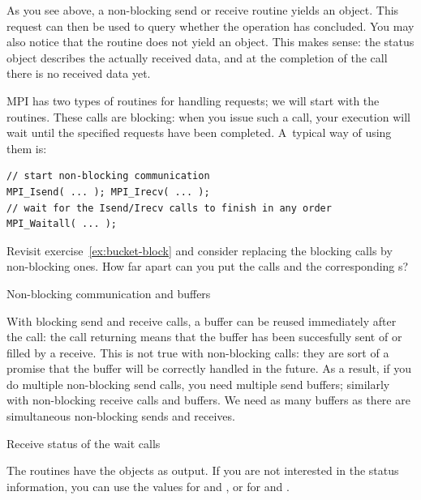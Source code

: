 As you see above, a non-blocking send or receive routine yields
an  object. This request can then be used to
query whether the operation has concluded. You may also notice that
the  routine does not 
yield an  object.
This makes sense: the status object
describes the actually received data, and at the completion of the
 call there is no received data yet.

MPI has two types of routines for handling requests; we will start
with the  routines. These
calls are blocking: when you issue
such a call, your execution will wait until the specified requests
have been completed. A~typical way of using them is:
\begin{lstlisting}
// start non-blocking communication
MPI_Isend( ... ); MPI_Irecv( ... );
// wait for the Isend/Irecv calls to finish in any order
MPI_Waitall( ... );
\end{lstlisting}


\begin{exercise}
  \label{ex:bucket-nonblock}
  Revisit exercise~\ref{ex:bucket-block} and consider replacing the blocking
  calls by non-blocking ones. How far apart can you put the
   calls and the corresponding s?
\end{exercise}

 {Non-blocking communication and buffers}

With blocking send and receive calls, a buffer can be reused
immediately after the call: the call returning means that the buffer
has been succesfully sent of or filled by a receive. This is not true
with non-blocking calls: they are sort of a promise that the buffer
will be correctly handled in the future. As a result, if you do
multiple non-blocking send calls, you need multiple send buffers;
similarly with non-blocking receive calls and buffers.
We need as many buffers as there are
simultaneous non-blocking sends and receives.
%

 {Receive status of the wait calls}

The  routines have the 
objects as output.
If you are not interested in
the status information, you can use the values
 for  and
,
or  for 
and .


